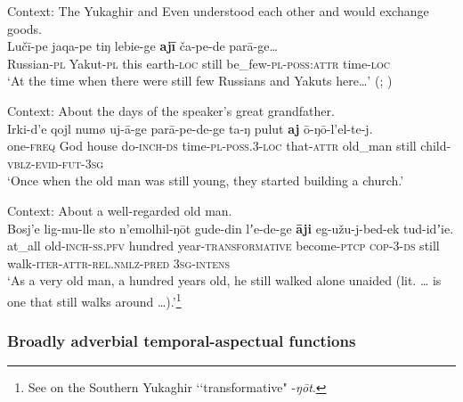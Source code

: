 \begin{exe}
	\ex\label{exAppendixKolyma1}
	Context: The Yukaghir and Even understood each other and would exchange goods.\\
	\gll Lučī-pe jaqa-pe tiŋ lebie-ge \textbf{ajī} ča-pe-de parā-ge…\\
	Russian-\textsc{pl} Yakut-\textsc{pl} this earth-\textsc{loc} still be\_few-\textsc{pl}-\textsc{poss}:\textsc{attr} time-\textsc{loc}\\
	\glt \lq At the time when there were still few Russians and Yakuts here…' (\cite[138, 157]{YukaghirTexts}; \citeyear[425]{Maslova2003})

	\ex Context: About the days of the speaker’s great grandfather.\\
	\gll Irki-d’e qojl numø uj-ā-ge parā-pe-de-ge ta-ŋ pulut \textbf{aj} ō-ŋō-l’el-te-j.\\
	one-\textsc{freq} God house do-\textsc{inch}-\textsc{ds} time-\textsc{pl}-\textsc{poss}.3-\textsc{loc} that-\textsc{attr} old\_man still child-\textsc{vblz}-\textsc{evid}-\textsc{fut}-3\textsc{sg}\\
	\glt \lq Once when the old man was still young, they started building a church.' \parencite[Text 36]{NikolaevaMayer2004}
	
	\largerpage
	\ex\label{exAppendixKolyma3}
	Context: About a well-regarded old man.\\
	\gll Bosj’e lig-mu-lle sto n’emolhil-ŋōt gude-din lʼe-de-ge \textbf{āji} eg-užu-j-bed-ek tud-idʼie.\\
	at\_all old-\textsc{inch}-\textsc{ss}.\textsc{pfv} hundred year-\textsc{transformative} become-\textsc{ptcp} \textsc{cop}-3-\textsc{ds} still walk-\textsc{iter}-\textsc{attr}-\textsc{rel}.\textsc{nmlz}-\textsc{pred} 3\textsc{sg}-\textsc{intens}\\
	\glt \lq As a very old man, a hundred years old, he still walked alone unaided (lit. … is one that still walks around …).'\footnote{See \textcite[126–128]{Maslova2003} on the Southern Yukaghir \lq\lq transformative" \mbox{-\textit{ŋōt}}.} \parencite[141, 158]{YukaghirTexts}
	\end{exe}
	
\subsubsection{Broadly adverbial temporal-aspectual functions}
